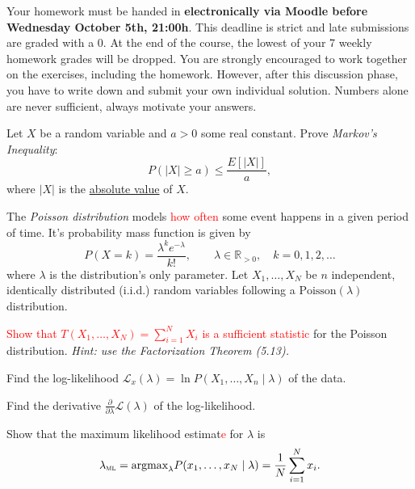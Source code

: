 \documentclass[a4paper,10pt,landscape,twocolumn]{scrartcl}
\newcommand\deadline{Wednesday October 5th, 21:00h}
\newcommand{\philip}[1]{\textcolor{red}{#1}}
\begin{document}
\homeworkproblems

{\sffamily\noindent
Your homework must be handed in \textbf{electronically via Moodle before \deadline}.  This deadline is strict and late submissions are graded with a 0. At the end of the course, the lowest of your 7 weekly homework grades will be dropped. You are strongly encouraged to work together on the exercises, including the homework. However, after this discussion phase, you have to write down and submit your own individual solution. Numbers alone are never sufficient, always motivate your answers.
}

\begin{exercise}
	Let $X$ be a random variable and $a > 0$ some real constant. Prove 
	\emph{Markov's Inequality}:
	\[
	P(|X| \ge a) \le \frac{E[|X|]}{a},
	\]
	where $|X|$ is the \href{https://en.wikipedia.org/wiki/Absolute_value}{absolute value} of $X$.
\end{exercise}


\begin{exercise}
	The \emph{Poisson distribution} 	models \philip{how often} some event happens in a given period of time. It's probability mass function is given by
	\[
	P(X = k) = {\frac {\lambda ^{k}e^{-\lambda }}{k!}}, \qquad \lambda \in \mathbb{R}_{>0}, \quad k=0,1,2,\dots
	\]
	where $\lambda$ is the distribution's only parameter. 
	Let $X_1, \dots, X_N$ be $n$ independent, identically distributed (i.i.d.) random variables following a $\text{Poisson}(\lambda)$ distribution.
		
	\begin{subex}[1pt]
	\philip{Show that $T(X_1, \dots, X_N) = \sum_{i=1}^N X_i$ is a sufficient statistic} for the Poisson distribution. \emph{Hint: use the Factorization Theorem (5.13).}
	\end{subex}

	\begin{subex}[0.5pt]
	Find the log-likelihood $\mathcal L_x(\lambda) = \ln P(X_1, \dots, X_n \mid \lambda)$ of the data.
	\end{subex}
	
	\begin{subex}[0.5pt]
		Find the derivative $\frac{\partial}{\partial \lambda} \mathcal L(\lambda)$ of the log-likelihood.
	\end{subex}
	
	\begin{subex}[1pt]
		Show that the maximum likelihood estimat\philip{e} for $\lambda$ is
		\[
			\lambda_\textsc{ml} = \text{argmax}_\lambda P(x_1, \dots, x_N \mid \lambda) = \frac{1}{N}\sum_{i=1}^N x_i.
		\]
	\end{subex}
	
\end{exercise}
\end{document}
